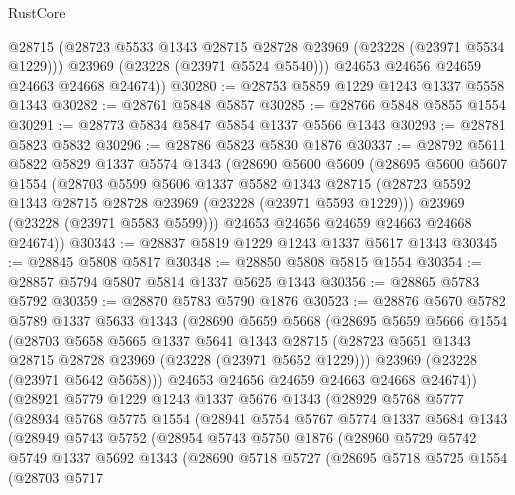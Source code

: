 \begin{lexlean}{RustCore}
\begin{coremodule}
          @28715
          (@28723 @5533 @1343 @28715 @28728 @23969 (@23228 (@23971 @5534 @1229)))
          @23969
          (@23228 (@23971 @5524 @5540)))
        @24653
        @24656
        @24659
        @24663
        @24668
        @24674))
@30280 := @28753 @5859 @1229 @1243 @1337 @5558 @1343
@30282 := @28761 @5848 @5857
@30285 := @28766 @5848 @5855 @1554
@30291 := @28773 @5834 @5847 @5854 @1337 @5566 @1343
@30293 := @28781 @5823 @5832
@30296 := @28786 @5823 @5830 @1876
@30337 := @28792
    @5611
    @5822
    @5829
    @1337
    @5574
    @1343
    (@28690
      @5600
      @5609
      (@28695
        @5600
        @5607
        @1554
        (@28703
          @5599
          @5606
          @1337
          @5582
          @1343
          @28715
          (@28723 @5592 @1343 @28715 @28728 @23969 (@23228 (@23971 @5593 @1229)))
          @23969
          (@23228 (@23971 @5583 @5599)))
        @24653
        @24656
        @24659
        @24663
        @24668
        @24674))
@30343 := @28837 @5819 @1229 @1243 @1337 @5617 @1343
@30345 := @28845 @5808 @5817
@30348 := @28850 @5808 @5815 @1554
@30354 := @28857 @5794 @5807 @5814 @1337 @5625 @1343
@30356 := @28865 @5783 @5792
@30359 := @28870 @5783 @5790 @1876
@30523 := @28876
    @5670
    @5782
    @5789
    @1337
    @5633
    @1343
    (@28690
      @5659
      @5668
      (@28695
        @5659
        @5666
        @1554
        (@28703
          @5658
          @5665
          @1337
          @5641
          @1343
          @28715
          (@28723 @5651 @1343 @28715 @28728 @23969 (@23228 (@23971 @5652 @1229)))
          @23969
          (@23228 (@23971 @5642 @5658)))
        @24653
        @24656
        @24659
        @24663
        @24668
        @24674))
    (@28921
      @5779
      @1229
      @1243
      @1337
      @5676
      @1343
      (@28929
        @5768
        @5777
        (@28934
          @5768
          @5775
          @1554
          (@28941
            @5754
            @5767
            @5774
            @1337
            @5684
            @1343
            (@28949
              @5743
              @5752
              (@28954
                @5743
                @5750
                @1876
                (@28960
                  @5729
                  @5742
                  @5749
                  @1337
                  @5692
                  @1343
                  (@28690
                    @5718
                    @5727
                    (@28695
                      @5718
                      @5725
                      @1554
                      (@28703
                        @5717

\end{coremodule}
\end{lexlean}
